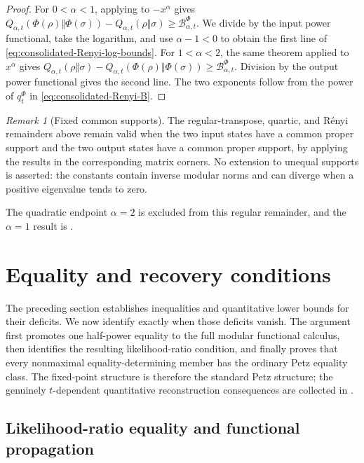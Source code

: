 \documentclass[11pt]{article}
\theoremstyle{remark}
\newtheorem{remark}[remark]{Remark}
\newcommand{\1}{\mathbbm{1}}
\begin{document}
\begin{proof}
For $0<\alpha<1$, applying
 to $-x^\alpha$ gives
$Q_{\alpha,t}(\Phi(\rho)\Vert\Phi(\sigma))
-Q_{\alpha,t}(\rho\Vert\sigma)
\geq\mathcal B_{\alpha,t}^{\Phi}$.  We divide by the input power
functional, take the logarithm, and use $\alpha-1<0$ to obtain the
first line of \eqref{eq:consolidated-Renyi-log-bounds}.  For
$1<\alpha<2$, the same theorem applied to $x^\alpha$ gives
$Q_{\alpha,t}(\rho\Vert\sigma)
-Q_{\alpha,t}(\Phi(\rho)\Vert\Phi(\sigma))
\geq\mathcal B_{\alpha,t}^{\Phi}$.  Division by the output power
functional gives the second line.  The two exponents follow from
the power of $q_t^\Phi$ in \eqref{eq:consolidated-Renyi-B}.
\end{proof}

\begin{remark}[Fixed common supports]
The regular-transpose, quartic, and R\'enyi remainders above remain
valid when the two input states have a common proper support and the
two output states have a common proper support, by applying the
results in the corresponding matrix corners.  No extension to
unequal supports is asserted: the constants contain inverse modular
norms and can diverge when a positive eigenvalue tends to zero.
\end{remark}

The quadratic endpoint $\alpha=2$ is excluded from this regular
remainder, and the $\alpha=1$ result is
.

\section{Equality and recovery conditions}
\label{sec:consolidated-recovery}

The preceding section establishes inequalities and quantitative lower
bounds for their deficits.  We now identify exactly when those deficits
vanish.  The argument first promotes one half-power equality to the
full modular functional calculus, then identifies the resulting
likelihood-ratio condition, and finally proves that every nonmaximal
equality-determining member has the ordinary Petz equality class.
The fixed-point structure is therefore the standard Petz structure;
the genuinely $t$-dependent quantitative reconstruction
consequences are collected in
.

\subsection{Likelihood-ratio equality and functional propagation}
\end{document}
